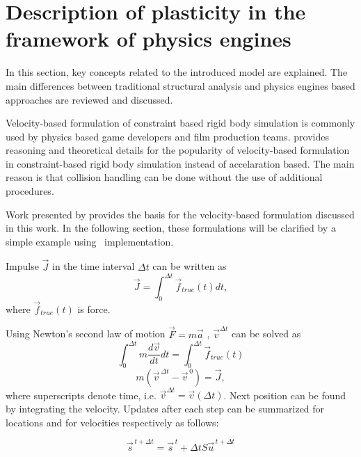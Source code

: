 \section{Description of plasticity in the framework of physics engines}

In this section, key concepts related to the introduced model are explained. The main differences between 
traditional structural analysis and physics engines based approaches are reviewed and discussed.

Velocity-based formulation of constraint based rigid body simulation 
is  commonly used by physics based game
developers and film production teams.
\citet{erleben.thesis} 
provides reasoning and theoretical details for the popularity of 
velocity-based formulation in constraint-based rigid body simulation instead of accelaration based. 
The main reason is that collision handling can be done without the use of additional procedures.

Work presented by  
\citet{erleben.thesis} provides the basis for the velocity-based formulation discussed in this work.
In the following section, these formulations will be clarified by a simple example using \bullet\ implementation.

Impulse $\vec{J}$
in the time interval $\Delta t $ can be written as
\begin{equation} \label{eq:impulseIntegral}
\vec{J} = \int_{0}^{\Delta t} \vec{f}_{true}(t) dt,
\end{equation}
where $\vec{f}_{true}(t)$ is force.

Using Newton's second law of motion $\vec{F}=m\vec{a}$ ,
$\vec{v}^{\Delta t}$ can be solved as
\begin{equation} \label{eq:impulseIntegraWithNewton}
\int_{0}^{\Delta t} m \frac{d\vec{v}}{dt}dt= \int_{0}^{\Delta t} \vec{f}_{true}(t)
\end{equation}
\begin{equation} \label{eq:impulse}
m(\vec{v}^{\, \Delta t} - \vec{v}^{\, 0})=\vec{J},
\end{equation}
where superscripts denote time, i.e. ${\vec{v}}^{\Delta t}=\vec{v}(\Delta t)$.
Next position can be found
by integrating the velocity.
Updates after each step can be summarized  for locations and  
for velocities respectively as follows:

\begin{equation} \label{eq:eomL} %
\vec{s}^{\, t+\Delta t} = \vec{s}^{\, t}+\Delta t S \vec{u}^{\, t+\Delta t}
\end{equation}

